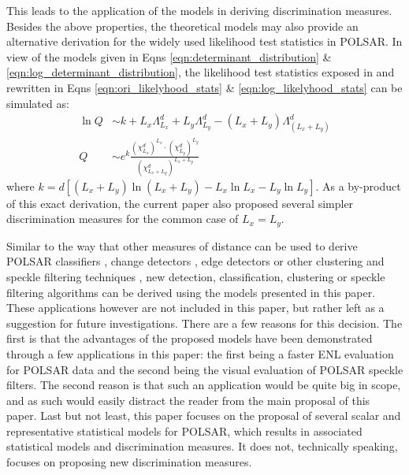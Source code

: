 \documentclass[journal,12pt,draftcls,onecolumn]{IEEEtran}
\begin{document}
This leads to the application of the models in deriving discrimination measures.
Besides the above properties, the theoretical models may also provide an alternative derivation for the widely used likelihood test statistics in POLSAR.
In view of the models given in Eqns \ref{eqn:determinant_distribution} \& \ref{eqn:log_determinant_distribution},
  the likelihood test statistics exposed in \cite{Conradsen_2003_TGRS_4} and rewritten in Eqns \ref{eqn:ori_likelyhood_stats} \& \ref{eqn:log_likelyhood_stats}
can be simulated as:
\begin{align*}
  \ln{Q} &\sim  k + L_x \Lambda^d_{L_x} + L_y \Lambda^d_{L_y} - (L_x + L_y) \Lambda^d_{(L_x + L_y)} \\
  Q &\sim e^k \frac{(\chi^d_{L_x})^{L_x} \cdot (\chi^d_{L_y})^{L_y}}{(\chi^d_{L_x + L_y})^{L_x + L_y}}   
\end{align*}
where $k = d \left[ (L_x + L_y) \ln(L_x + L_y) - L_x \ln{L_x} - L_y \ln{L_y} \right]$.
As a by-product of this exact derivation, the current paper also proposed several simpler discrimination measures for the common case of $L_x=L_y$.

Similar to the way that other measures of distance can be used to derive POLSAR classifiers \cite{Lee_1999_TGRS}, change detectors \cite{Conradsen_2003_TGRS_4}, edge detectors \cite{Schou_2003_TGRS_20} or other clustering and speckle filtering techniques \cite{Le_2010_ACRS} \cite{Le_2011_ACRS}, 
new detection, classification, clustering or speckle filtering algorithms can be derived using the models presented in this paper.
These applications however are not included in this paper, but rather left as a suggestion for future investigations.
There are a few reasons for this decision.
The first is that the advantages of the proposed models have been demonstrated through a few applications in this paper:
  the first being a faster ENL evaluation for POLSAR data and
  the second being the visual evaluation of POLSAR speckle filters.
The second reason is that such an application would be quite big in scope, and as such would easily distract the reader from the main proposal of this paper.
Last but not least, this paper focuses on the proposal of several scalar and representative statistical models for POLSAR, which results in associated statistical models and discrimination measures.
It does not, technically speaking, focuses on proposing new discrimination measures.
\end{document}
